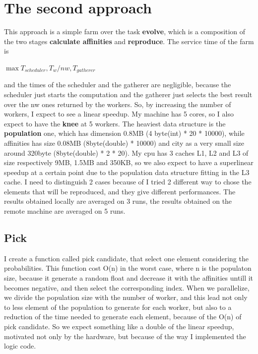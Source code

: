 \documentclass{article}
\begin{document}
    \section{The second approach}\label{sec:s3}
	This approach is a simple farm over the task \textbf{evolve}, which is a composition of the two stages \textbf{calculate affinities} and \textbf{reproduce}.
The service time of the farm is

	\centerline{$\max{T_{scheduler}, T_{w}/nw, T_{gatherer}}$}

    and the times of the scheduler and the gatherer are negligible, because the scheduler just starts the computation and the gatherer just selects the best result over the nw ones returned by the workers. So, by increasing the number of workers, I expect to see a linear speedup. My machine has 5 cores, so I also expect to have the \textbf{knee} at 5 workers. The heaviest data structure is the \textbf{population} one, which has dimension 0.8MB (4 byte(int) * 20 * 10000), while affinities has size 0.08MB (8byte(double) * 10000) and city as a very small size around 320byte (8byte(double) * 2 * 20). My cpu has 3 caches L1, L2 and L3 of size respectively 9MB, 1.5MB and 350KB, so we also expect to have a superlinear speedup at a certain point due to the population data structure fitting in the L3 cache. 
    I need to distinguish 2 cases because of I tried 2 different way to chose the elements that will be reproduced, and they give different performances. The results obtained locally are averaged on 3 runs, the results obtained on the remote machine are averaged on 5 runs.

	\subsection{Pick}\label{sec:s31}
I create a function called pick candidate, that select one element considering the probabilities. This function cost O(n) in the worst case, where n is the populaton size, because it generate a random float and decrease it with the affinities untill it becomes negative, and then select the corresponding index. When we parallelize, we divide the population size with the number of worker, and this lead not only to less element of the population to generate for each worker, but also to a reduction of the time needed to generate each element, because of the O(n) of pick candidate. So we expect something like a double of the linear speedup, motivated not only by the hardware, but because of the way I implemented the logic code.
\end{document}

